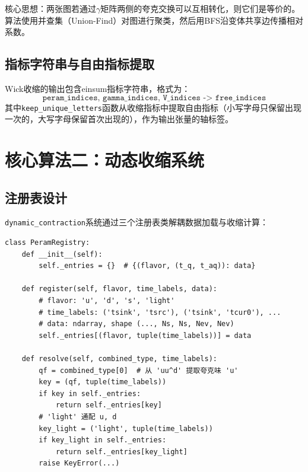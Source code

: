 \documentclass[11pt,a4paper]{ctexart}
\begin{document}
核心思想：两张图若通过$\gamma$矩阵两侧的夸克交换可以互相转化，则它们是等价的。算法使用并查集（Union-Find）对图进行聚类，然后用BFS沿变体共享边传播相对系数。

\subsection{指标字符串与自由指标提取}

Wick收缩的输出包含einsum指标字符串，格式为：
\begin{equation}
\texttt{peram\_indices, gamma\_indices, V\_indices -> free\_indices}
\end{equation}
其中\texttt{keep\_unique\_letters}函数从收缩指标中提取自由指标（小写字母只保留出现一次的，大写字母保留首次出现的），作为输出张量的轴标签。

\section{核心算法二：动态收缩系统}

\subsection{注册表设计}

\texttt{dynamic\_contraction}系统通过三个注册表类解耦数据加载与收缩计算：

\begin{codebox}
\begin{lstlisting}[style=python]
class PeramRegistry:
    def __init__(self):
        self._entries = {}  # {(flavor, (t_q, t_aq)): data}

    def register(self, flavor, time_labels, data):
        # flavor: 'u', 'd', 's', 'light'
        # time_labels: ('tsink', 'tsrc'), ('tsink', 'tcur0'), ...
        # data: ndarray, shape (..., Ns, Ns, Nev, Nev)
        self._entries[(flavor, tuple(time_labels))] = data

    def resolve(self, combined_type, time_labels):
        qf = combined_type[0]  # 从 'uu^d' 提取夸克味 'u'
        key = (qf, tuple(time_labels))
        if key in self._entries:
            return self._entries[key]
        # 'light' 通配 u, d
        key_light = ('light', tuple(time_labels))
        if key_light in self._entries:
            return self._entries[key_light]
        raise KeyError(...)
\end{lstlisting}
\end{codebox}
\end{document}
